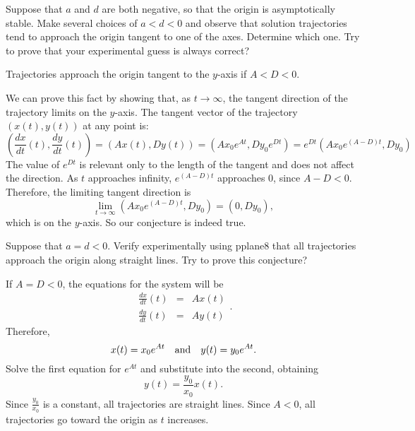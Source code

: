 \documentclass{ximera}
\begin{document}
\begin{exercise} \label{c3.4.5}
Suppose that $a$ and $d$ are both negative, so that the origin
is asymptotically stable.  Make several choices of $a<d<0$ and
observe that solution trajectories tend to approach the origin
tangent to one of the axes.  Determine which one.  Try to prove
that your experimental guess is always correct?

\begin{solution}

\ans Trajectories approach the origin tangent to the $y$-axis if
$A < D < 0$. 

\soln We can prove this fact by showing that, as $t \rightarrow \infty$,
the tangent direction of the trajectory limits on the $y$-axis.  The
tangent vector of the trajectory $(x(t),y(t))$ at any point is:
\[ \left(\frac{dx}{dt}(t), \frac{dy}{dt}(t)\right) = \left(Ax(t),
Dy(t)\right) = \left(Ax_0e^{At}, Dy_0e^{Dt}\right) =
e^{Dt}\left(Ax_0e^{(A - D)t}, Dy_0\right) \]
The value of $e^{Dt}$ is relevant only to the length of the
tangent and does not affect the direction.  As $t$ approaches
infinity, $e^{(A - D)t}$ approaches $0$, since $A - D < 0$.
Therefore, the limiting tangent direction is
\[ \lim_{t \rightarrow \infty} \left(Ax_0e^{(A - D)t}, Dy_0\right)
= (0, Dy_0), \]
which is on the $y$-axis.  So our conjecture is indeed true.

\end{solution}
\end{exercise}

\begin{exercise} \label{c3.4.6}
Suppose that $a=d<0$.  Verify experimentally using {\sf pplane8}
that all trajectories approach the origin along straight lines.
Try to prove this conjecture?

\begin{solution}

If $A = D < 0$, the equations for the system will be
\[ \begin{array}{rcl}
\frac{dx}{dt}(t) & = & Ax(t) \\
\frac{dy}{dt}(t) & = & Ay(t)\end{array}. \]
Therefore,
\[ x(t) = x_0e^{At} \quad\mbox{and}\quad y(t) = y_0e^{At}. \]
Solve the first equation for $e^{At}$ and substitute into the
second, obtaining \[ y(t) = \frac{y_0}{x_0}x(t). \]
Since $\frac{y_0}{x_0}$ is a constant, all trajectories are
straight lines.  Since $A < 0$, all trajectories go toward the
origin as $t$ increases.

\end{solution}
\end{exercise}
\end{document}
